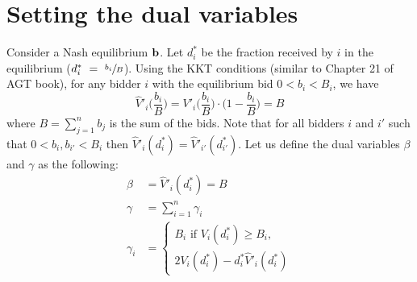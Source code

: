 \section{Setting the dual variables}

Consider a Nash equilibrium $\mathbf{b}$. Let $d_{i}^*$ be the fraction received by $i$ in the equilibrium ($d^{*}_{i}~=~\sfrac{b_{i}}{B}$).
Using the KKT conditions (similar to Chapter 21 of AGT book), for any bidder $i$ with the equilibrium bid $0 < b_{i} < B_{i}$, we have
$$
\hat{V}'_{i}\biggl( \frac{b_{i}}{B} \biggr)
= V'_{i}\biggl( \frac{b_{i}}{B} \biggr) \cdot \biggl( 1 - \frac{b_{i}}{B} \biggr)
= B
$$
where $B = \sum_{j=1}^{n} b_{j}$ is the sum of the bids.
Note that for all bidders $i$ and $i'$ such that $0 < b_{i}, b_{i'} < B_{i}$ then
$ \hat{V}'_{i}(d^{*}_{i})  = \hat{V}'_{i'}(d_{i'}^*)$.
%
Let us define the dual variables $\beta$ and $\gamma$ as the following:
\begin{align*}
	\beta &= \hat{V}'_{i}(d^{*}_{i}) = B\\
	\gamma &= \sum_{i=1}^{n} \gamma_{i}\\
\gamma_{i} &= \begin{cases}
	B_{i} \text{ if } V_{i}(d^{*}_{i}) \geq B_{i}, \\
	2 V_{i}(d^{*}_{i}) -   d^{*}_{i} \hat{V}'_{i}(d^{*}_{i})
\end{cases}
\end{align*}
